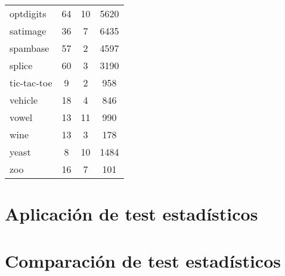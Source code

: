 \begin{table}[H]
\begin{tabular}{@{}lccc@{}}
optdigits         & 64                  & 10               & 5620                 \\
satimage          & 36                  & 7                & 6435                 \\
spambase          & 57                  & 2                & 4597                 \\
splice            & 60                  & 3                & 3190                 \\
tic-tac-toe       & 9                   & 2                & 958                  \\
vehicle           & 18                  & 4                & 846                  \\
vowel             & 13                  & 11               & 990                  \\
wine              & 13                  & 3                & 178                  \\
yeast             & 8                   & 10               & 1484                 \\
zoo               & 16                  & 7                & 101                  \\ \bottomrule
\end{tabular}
\end{table}

\section{Aplicación de test estadísticos}

\section{Comparación de test estadísticos}